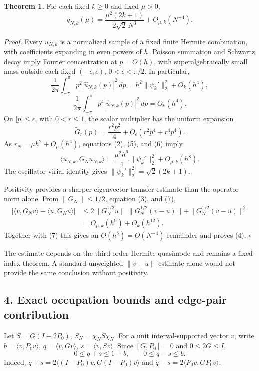 \documentclass[
  10pt,
  a4paper,
]{article}
\begin{document}
\textbf{Theorem 1.} For each fixed \(k\ge0\) and fixed \(\mu>0\), \[
\boxed{
q_{N,k}(\mu)=\frac{\mu^2(2k+1)}{2\sqrt2\,N^3}
+O_{\mu,k}(N^{-4}).
}
\tag{4}
\]

\emph{Proof.} Every \(u_{N,k}\) is a normalized sample of a fixed finite Hermite combination, with coefficients expanding in even powers of \(h\). Poisson summation and Schwartz decay imply Fourier concentration at \(p=O(h)\), with superalgebraically small mass outside each fixed \((-\epsilon,\epsilon)\), \(0<\epsilon<\pi/2\). In particular, \[
\frac1{2\pi}\int_{-\pi}^{\pi}p^2|\widehat u_{N,k}(p)|^2\,dp
=h^2\|\psi_k'\|_2^2+O_k(h^4),
\] \[
\frac1{2\pi}\int_{-\pi}^{\pi}p^4|\widehat u_{N,k}(p)|^2\,dp=O_k(h^4).
\tag{5}
\] On \(|p|\le\epsilon\), with \(0<r\le1\), the scalar multiplier has the uniform expansion \[
\widetilde G_r(p)=\frac{r^2p^2}{4}
+O_\epsilon(r^2p^4+r^4p^4).
\tag{6}
\] As \(r_N=\mu h^2+O_\mu(h^4)\), equations (2), (5), and (6) imply \[
\langle u_{N,k},G_Nu_{N,k}\rangle
=\frac{\mu^2h^6}{4}\|\psi_k'\|_2^2+O_{\mu,k}(h^8).
\tag{7}
\] The oscillator virial identity gives \(\|\psi_k'\|_2^2=\sqrt2(2k+1)\).

Positivity provides a sharper eigenvector-transfer estimate than the operator norm alone. From \(\|G_N\|\le1/2\), equation (3), and (7), \[
\begin{aligned}
|\langle v,G_Nv\rangle-\langle u,G_Nu\rangle|
&\le2\|G_N^{1/2}u\|\,\|G_N^{1/2}(v-u)\|
+\|G_N^{1/2}(v-u)\|^2\\
&=O_{\mu,k}(h^9)+O_k(h^{12}).
\end{aligned}
\] Together with (7) this gives an \(O(h^8)=O(N^{-4})\) remainder and proves (4). \(\square\)

The estimate depends on the third-order Hermite quasimode and remains a fixed-index theorem. A standard unweighted \(\|v-u\|\) estimate alone would not provide the same conclusion without positivity.

\subsection{4. Exact occupation bounds and edge-pair contribution}\label{exact-occupation-bounds-and-edge-pair-contribution}

Let \(S=G(I-2P_0)\), \(S_N=\chi_NS\chi_N\). For a unit interval-supported vector \(v\), write \(b=\langle v,P_0v\rangle\), \(q=\langle v,Gv\rangle\), \(s=\langle v,Sv\rangle\). Since \([G,P_0]=0\) and \(0\le2G\le I\), \[
\boxed{0\le q+s\le1-b,\qquad0\le q-s\le b.}
\tag{8}
\] Indeed, \(q+s=2\langle (I-P_0)v,G(I-P_0)v\rangle\) and \(q-s=2\langle P_0v,GP_0v\rangle\).
\end{document}
